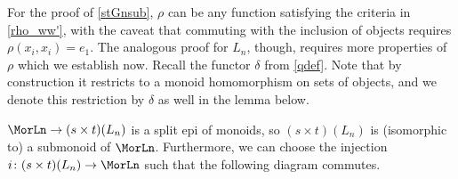 For the proof of \cref{stGnsub}, $\rho$ can be any function satisfying the criteria in \cref{rho_ww'}, with the caveat that commuting with the inclusion of objects requires $\rho(x_i, x_i) = e_1$. The analogous proof for $L_n$, though, requires more properties of $\rho$ which we establish now. Recall the functor $\delta$ from \cref{qdef}. Note that by construction it restricts to a monoid homomorphism on sets of objects, and we denote this restriction by $\delta$ as well in the lemma below.

\begin{prop} \label{stZsub} $\MorLn \rightarrow (s \times t)(L_n)$ is a split epi of monoids, so $(s \times t)(L_n)$ is (isomorphic to) a submonoid of $\MorLn$. Furthermore, we can choose the injection $i \colon (s \times t)(L_n) \rightarrow \MorLn$ such that the following diagram commutes.
\begin{center}
\end{center}		
\end{prop}
